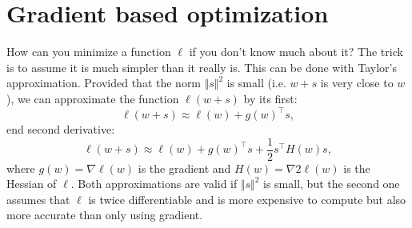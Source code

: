 \section{Gradient based optimization}
\FloatBarrier
\label{sec:gradient}
How can you minimize a function $\ell$ if you don't know much about it? 
The trick is to assume it is much simpler than it really is. This can be done with 
Taylor's approximation. Provided that the norm $\Vert s \Vert^{2}$ is small 
(i.e. $w + s$ is very close to $w$), we can approximate the function $\ell (w+s)$ by its 
first: 
\begin{equation}
	\label{equ:first_and_second_derivative}
	\ell(w+s) \approx \ell(w) + g(w)^{\top}s,
\end{equation}
end second derivative:
\begin{equation}
	\label{equ:first_and_second_derivative}
	\ell(w+s) \approx \ell(w) + g(w)^{\top}s + \frac{1}{2}s^{\top}H(w)s,
\end{equation}
where $g(w)=\nabla \ell (w)$ is the gradient and $H(w)=\nabla 2 \ell (w)$ 
is the Hessian of $\ell$.
Both approximations are valid if $\Vert s\Vert^{2}$ is small, but the second one assumes that
$\ell$ is twice differentiable and is more expensive to compute but also more accurate 
than only using gradient. 

